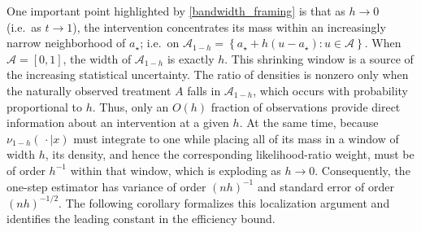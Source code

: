 \documentclass[11pt,twoside]{article}
\theoremstyle{definition}
\theoremstyle{remark}
\begin{document}
One important point highlighted by \cref{bandwidth_framing} is that as $h \to 0$ (i.e.\ as $t \to 1$), the intervention concentrates its mass within an increasingly narrow neighborhood of $a_\star$; i.e.\ on $\mathcal{A}_{1-h} = \left\{a_\star+h(u-a_\star):u\in\mathcal{A} \right\}$. When $\mathcal{A}=[0,1]$, the width of $\mathcal{A}_{1-h}$ is exactly $h$. This shrinking window is a source of the increasing statistical uncertainty. The ratio of densities is nonzero only when the naturally observed treatment $A$ falls in $\mathcal{A}_{1-h}$, which occurs with probability proportional to $h$. Thus, only an $O(h)$ fraction of observations provide direct information about an intervention at a given $h$. At the same time, because $\nu_{1-h}(\, \cdot\mid x)$ must integrate to one while placing all of its mass in a window of width $h$, its density, and hence the corresponding likelihood-ratio weight, must be of order $h^{-1}$ within that window, which is exploding as $h \to 0$. Consequently, the one-step estimator has variance of order $(nh)^{-1}$ and standard error of order $(nh)^{-1/2}$. The following corollary formalizes this localization argument and identifies the leading constant in the efficiency bound.
\end{document}
